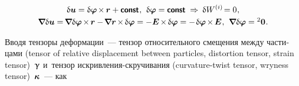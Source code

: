 \begin{otherlanguage}{russian}
\nopagebreak\vspace{-0.1em}\begin{equation*}
\begin{array}{c}
\variation{\fieldofdisplacements} = \variation{\fieldofrotations} \hspace{-0.2ex} \times \hspace{-0.12ex} \bm{r} + \boldconst \hspace{.1ex} ,
\:\,
\variation{\fieldofrotations} = \boldconst
\hspace{.64ex}\Rightarrow\hspace{.5ex}
\variation{\internalwork} \hspace{-0.2ex} = 0 \hspace{.1ex},
\\[.25em]
%
\boldnabla \variation{\fieldofdisplacements}
= \hspace{-0.25ex} \boldnabla \variation{\fieldofrotations} %
\hspace{-0.2ex} \times \hspace{-0.2ex} \bm{r}
- \hspace{-0.25ex} \boldnabla \bm{r} \hspace{-0.2ex} \times \hspace{-0.2ex} \variation{\fieldofrotations}
= - \bm{E} \hspace{-0.2ex} \times \hspace{-0.2ex} \variation{\fieldofrotations}
= - \hspace{.2ex} \variation{\fieldofrotations} \hspace{-0.2ex} \times \hspace{-0.2ex} \bm{E}
\hspace{.1ex} ,
\:\,
\boldnabla \variation{\fieldofrotations} = {^2\bm{0}} \hspace{.1ex} .
\end{array}
\end{equation*}

\vspace{-0.1em} Вводя тензоры деформации~--- тензор относительного смещения между частицами (tensor of relative displacement between particles, distortion tensor, strain tensor)~$\bm{\upgamma}$ и~тензор искривления-скручивания (curvature-twist tensor, wryness tensor)~$\bm{\kappa}\hspace{-0.1ex}$~--- как


\end{otherlanguage}
